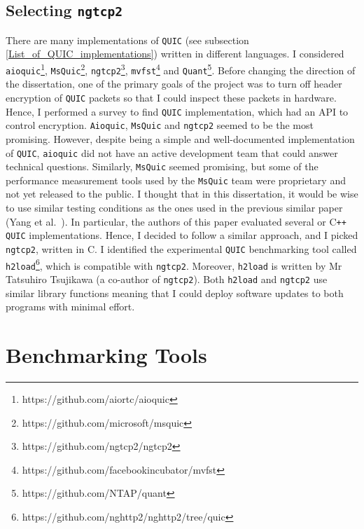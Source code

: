 \documentclass[12pt,a4paper]{report}
\begin{document}
\subsection{Selecting  \texttt{ngtcp2}}
There are many implementations of \texttt{QUIC} (see subsection \ref{List_of_QUIC_implementations}) written in different languages.
I considered  \texttt{aioquic}\footnote{https://github.com/aiortc/aioquic},  \texttt{MsQuic}\footnote{https://github.com/microsoft/msquic},  \texttt{ngtcp2}\footnote{https://github.com/ngtcp2/ngtcp2},  \texttt{mvfst}\footnote{https://github.com/facebookincubator/mvfst} and \texttt{Quant}\footnote{https://github.com/NTAP/quant}.
Before changing the direction of the dissertation, one of the primary goals of the project was to turn off header encryption of \texttt{QUIC} packets so that I could inspect these packets in hardware.
Hence, I performed a survey to find \texttt{QUIC} implementation, which had an API to control encryption. 
\texttt{Aioquic}, \texttt{MsQuic} and \texttt{ngtcp2} seemed to be the most promising.
However, despite being a simple and well-documented implementation of \texttt{QUIC}, \texttt{aioquic} did not have an active development team that could answer technical questions.
Similarly, \texttt{MsQuic} seemed promising, but some of the performance measurement tools used by the \texttt{MsQuic} team were proprietary and not yet released to the public. 
I thought that in this dissertation, it would be wise to use similar testing conditions as the ones used in the previous similar paper (Yang et al.~\cite{Making_QUIC_Quicker}).
In particular, the authors of this paper evaluated several  or C\texttt{++} \texttt{QUIC} implementations.
Hence, I decided to follow a similar approach, and I picked \texttt{ngtcp2}, written in C.
I identified the experimental \texttt{QUIC} benchmarking tool called \texttt{h2load}\footnote{https://github.com/nghttp2/nghttp2/tree/quic}, which is compatible with \texttt{ngtcp2}.
Moreover, \texttt{h2load} is written by Mr Tatsuhiro  Tsujikawa (a co-author of \texttt{ngtcp2}).
Both \texttt{h2load} and \texttt{ngtcp2} use similar library functions meaning that I could deploy software updates to both programs with minimal effort.





\section{Benchmarking Tools}
\end{document}
